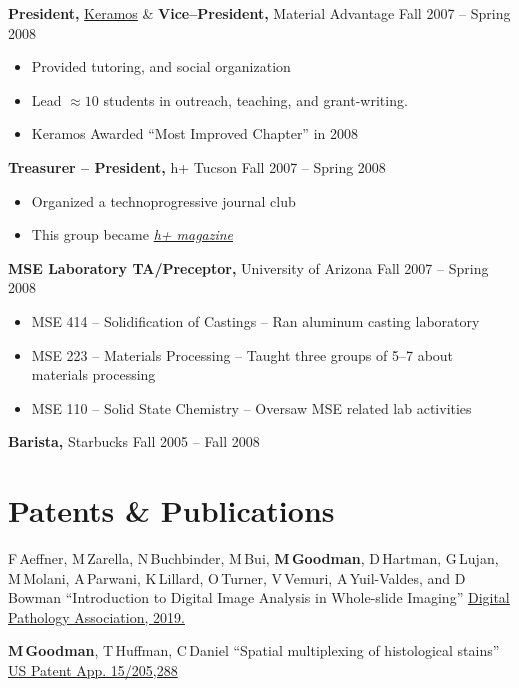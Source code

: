\documentclass{res}
\begin{document}
\begin{resume}
{\bf President,} \href{https://ceramics.org/members/member-communities/classes/keramos}{Keramos} \& {\bf Vice--President,} Material Advantage \hfill Fall 2007 -- Spring 2008
\begin{itemize} \itemsep -2pt
  \item Provided tutoring, and social organization
  \item Lead $\approx10$ students in outreach, teaching, and grant-writing.
  \item Keramos Awarded ``Most Improved Chapter'' in 2008
\end{itemize}

{\bf Treasurer -- President,} h+ Tucson \hfill Fall 2007 -- Spring 2008
\begin{itemize} \itemsep -2pt
  \item Organized a technoprogressive journal club
  \item This group became \href{http://hplusmagazine.com/}{\textit{h+ magazine}}
\end{itemize}

{\bf MSE Laboratory TA/Preceptor,} University of Arizona \hfill Fall 2007 -- Spring 2008
\begin{itemize} \itemsep -2pt
  \item MSE 414 -- Solidification of Castings -- Ran aluminum casting laboratory
  \item MSE 223 -- Materials Processing -- Taught three groups of 5--7 about materials processing
  \item MSE 110 -- Solid State Chemistry -- Oversaw MSE related lab activities
\end{itemize}

{\bf Barista,} Starbucks \hfill Fall 2005 -- Fall 2008

\section{Patents \& Publications}

  F\,Aeffner, M\,Zarella, N\,Buchbinder, M\,Bui, \textbf{M\,Goodman}, 
  D\,Hartman, G\,Lujan, M\,Molani, A\,Parwani, K\,Lillard, O\,Turner,
  V\,Vemuri, A\,Yuil-Valdes, and D\,Bowman
  ``Introduction to Digital Image Analysis in Whole-slide Imaging''
  \href{http://www.jpathinformatics.org/temp/JPatholInform1019-318182_000518.pdf}{Digital Pathology Association, 2019.}

  \textbf{M\,Goodman}, T\,Huffman, C\,Daniel
  ``Spatial multiplexing of histological stains''
  \href{https://patents.google.com/patent/US20170011511A1/en}{US Patent App. 15/205,288}


\end{resume}
\end{document}
